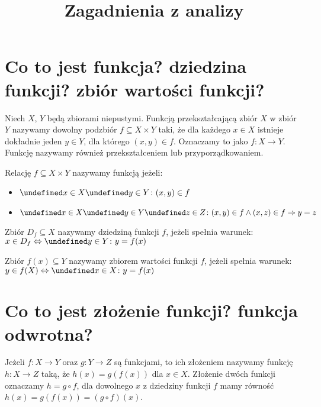 \documentclass{article}
\title{Zagadnienia z analizy}
\numberwithin{equation}{section}
\theoremstyle{definition}
\theoremstyle{case}
\let\implies\Rightarrow
\let\iff\Leftrightarrow
\let\oldforall\forall
\let\forall\undefined
\DeclareMathOperator{\forall}{\mkern2mu\oldforall}
\let\oldexists\exists
\let\exists\undefined
\DeclareMathOperator{\exists}{\mkern2mu\oldexists}
\begin{document}
\makeatletter
{}
\makeatother

\begin{titlepage}
	\vspace*{\fill}
	\begin{center}
		\makeatletter
		\LARGE
		\@title
		\makeatother
	\end{center}
	\vspace*{\fill}
	\tableofcontents
\end{titlepage}

\newpage

\setcounter{page}{1}

\section{Co to jest funkcja? dziedzina funkcji? zbiór wartości funkcji?}
Niech $X$, $Y$ będą zbiorami niepustymi.
Funkcją przekształcającą zbiór $X$ w zbiór $Y$ nazywamy dowolny podzbiór $f \subseteq X \times Y$ taki, że dla każdego $x \in X$ istnieje dokładnie jeden $y \in Y$, dla którego $(x,y)\in f$.
Oznaczamy to jako $f \colon X \to Y$. Funkcję nazywamy również przekształceniem lub przyporządkowaniem.

Relację $f \subseteq X \times Y$ nazywamy funkcją jeżeli:
\begin{itemize}
	\item $\forall x \in X \exists y \in Y \colon (x,y) \in f$
	\item $\forall x \in X \forall y \in Y \forall z \in Z \colon (x,y)\in f \land (x,z)\in f \implies y = z$
\end{itemize}

Zbiór $D_f \subseteq X$ nazywamy dziedziną funkcji $f$, jeżeli spełnia warunek:
$x \in D_f \iff \exists y \in Y \colon y = f(x)$

Zbiór $f(x) \subseteq Y$ nazywamy zbiorem wartości funkcji $f$, jeżeli spełnia warunek:
$y \in f(X) \iff \exists x \in X \colon y = f(x)$

\section{Co to jest złożenie funkcji? funkcja odwrotna?}
Jeżeli $f \colon X \to Y$ oraz $g \colon Y \to Z$ są funkcjami, to ich złożeniem nazywamy funkcję $h \colon X \to Z$ taką, że ${h(x) = g(f(x))}$ dla $x \in X$. Złożenie dwóch funkcji oznaczamy $h=g \circ f$, dla dowolnego $x$ z dziedziny funkcji $f$ mamy równość $h(x)=g(f(x))=(g \circ f)(x)$.
\end{document}
